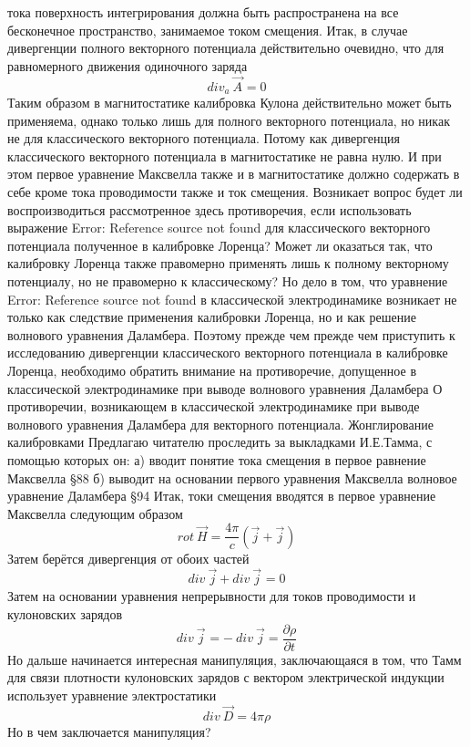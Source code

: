 \documentclass[11pt]{article}
\begin{document}
тока поверхность интегрирования должна быть распространена на все
бесконечное пространство, занимаемое током смещения. Итак, в случае
дивергенции полного векторного потенциала действительно очевидно, что
для равномерного движения одиночного заряда
\[di{{v}_{a}}\ \overrightarrow{{{A}_{}}}=0\] Таким образом в
магнитостатике калибровка Кулона действительно может быть применяема,
однако только лишь для полного векторного потенциала, но никак не для
классического векторного потенциала. Потому как дивергенция
классического векторного потенциала в магнитостатике не равна нулю. И
при этом первое уравнение Максвелла также и в магнитостатике должно
содержать в себе кроме тока проводимости также и ток смещения. Возникает
вопрос будет ли воспроизводиться рассмотренное здесь противоречия, если
использовать выражение Error: Reference source not found для
классического векторного потенциала полученное в калибровке Лоренца?
Может ли оказаться так, что калибровку Лоренца также правомерно
применять лишь к полному векторному потенциалу, но не правомерно к
классическому? Но дело в том, что уравнение Error: Reference source not
found в классической электродинамике возникает не только как следствие
применения калибровки Лоренца, но и как решение волнового уравнения
Даламбера. Поэтому прежде чем прежде чем приступить к исследованию
дивергенции классического векторного потенциала в калибровке Лоренца,
необходимо обратить внимание на противоречие, допущенное в классической
электродинамике при выводе волнового уравнения Даламбера О противоречии,
возникающем в классической электродинамике при выводе волнового
уравнения Даламбера для векторного потенциала. Жонглирование
калибровками Предлагаю читателю проследить за выкладками И.Е.Тамма, с
помощью которых он: а) вводит понятие тока смещения в первое равнение
Максвелла §88 б) выводит на основании первого уравнения Максвелла
волновое уравнение Даламбера §94 Итак, токи смещения вводятся в первое
уравнение Максвелла следующим образом
\[rot\ \overrightarrow{H}=\frac{4\pi }{c}\left( \overrightarrow{j}+{{\overrightarrow{j}}_{}} \right)\]
Затем берётся дивергенция от обоих частей
\[div\ \overrightarrow{j}+div\ {{\overrightarrow{j}}_{}}=0\] Затем на
основании уравнения непрерывности для токов проводимости и кулоновских
зарядов
\[div\ {{\overrightarrow{j}}_{}}=-\ div\ \overrightarrow{j}=\frac{\partial \rho }{\partial t}\]
Но дальше начинается интересная манипуляция, заключающаяся в том, что
Тамм для связи плотности кулоновских зарядов с вектором электрической
индукции использует уравнение электростатики
\[div\ \overrightarrow{D}=4\pi \rho \] Но в чем заключается манипуляция?
\end{document}
